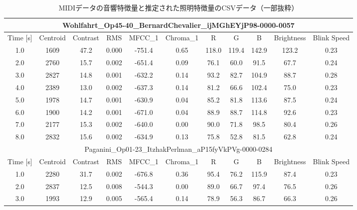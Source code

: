 \begin{table}[t]
\centering
\small
\caption{MIDIデータの音響特徴量と推定された照明特徴量のCSVデータ（一部抜粋）}\label{tab:csvmidi}
	\begin{tabular}{c|cccccccccc}	
		\hline
		\multicolumn{11}{c}{Wohlfahrt\_Op45-40\_BernardChevalier\_ijMGhEYjP98-0000-0057}                         \\
		\hline
		\hline
		Time [s] & Centroid   & Contrast    & RMS   & MFCC\_1 & Chroma\_1 & R     & G     & B
		         & Brightness & Blink Speed                                                                      \\
		\hline
		1.0      & 1609       & 47.2        & 0.000 & -751.4  & 0.65      & 118.0 & 119.4 & 142.9 & 123.2 & 0.23 \\
		2.0      & 2760       & 15.7        & 0.002 & -651.4  & 0.09      & 76.1  & 60.0  & 91.5  & 67.7  & 0.24 \\
		3.0      & 2827       & 14.8        & 0.001 & -632.2  & 0.14      & 93.2  & 82.7  & 104.9 & 88.7  & 0.28 \\
		4.0      & 2389       & 13.0        & 0.002 & -637.3  & 0.14      & 81.2  & 66.6  & 102.4 & 75.0  & 0.23 \\
		5.0      & 1978       & 14.7        & 0.001 & -630.9  & 0.04      & 85.2  & 81.8  & 113.6 & 87.5  & 0.24 \\
		6.0      & 1900       & 14.2        & 0.001 & -671.0  & 0.04      & 88.9  & 88.7  & 114.8 & 92.6  & 0.23 \\
		7.0      & 2177       & 15.3        & 0.002 & -640.0  & 0.00      & 90.0  & 71.8  & 98.5  & 80.4  & 0.26 \\
		8.0      & 2832       & 15.6        & 0.002 & -634.9  & 0.13      & 75.8  & 52.8  & 81.5  & 62.8  & 0.24 \\
		\hline
		\multicolumn{11}{c}{Paganini\_Op01-23\_ItzhakPerlman\_aP15fyVkPVg-0000-0284}                             \\
		\hline
		\hline
		Time [s] & Centroid   & Contrast    & RMS   & MFCC\_1 & Chroma\_1 & R     & G     & B
		         & Brightness & Blink Speed                                                                      \\
		\hline
		1.0      & 2280       & 31.7        & 0.002 & -676.8  & 0.36      & 95.4  & 76.2  & 115.9 & 87.4  & 0.23 \\
		2.0      & 2837       & 12.5        & 0.008 & -544.3  & 0.00      & 89.0  & 66.7  & 97.4  & 76.5  & 0.26 \\
		3.0      & 1993       & 12.9        & 0.005 & -565.4  & 0.14      & 78.9  & 56.3  & 86.7  & 66.3  & 0.26 \\

\end{tabular}
\end{table}
